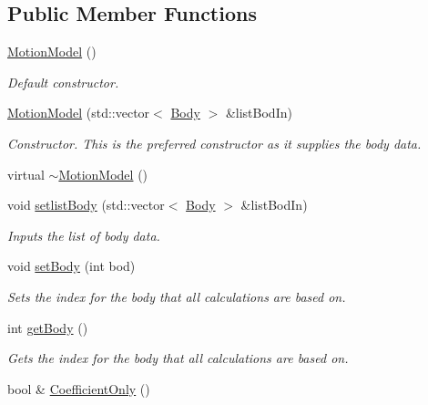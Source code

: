 \subsection*{Public Member Functions}
\begin{DoxyCompactItemize}
\item 
\hyperlink{classosea_1_1ofreq_1_1_motion_model_a5a5e4bba0f6ca24e1fdd316458f4f824}{Motion\-Model} ()
\begin{DoxyCompactList}\small\item\em Default constructor. \end{DoxyCompactList}\item 
\hyperlink{classosea_1_1ofreq_1_1_motion_model_aace42c5711b5486181e986add9a72b8f}{Motion\-Model} (std\-::vector$<$ \hyperlink{classosea_1_1ofreq_1_1_body}{Body} $>$ \&list\-Bod\-In)
\begin{DoxyCompactList}\small\item\em Constructor. This is the preferred constructor as it supplies the body data. \end{DoxyCompactList}\item 
virtual \hyperlink{classosea_1_1ofreq_1_1_motion_model_ac48a359c77d9efe39d4ec8c9e862a1cd}{$\sim$\-Motion\-Model} ()
\item 
void \hyperlink{classosea_1_1ofreq_1_1_motion_model_a92f6b9639a82aef868dbaf8445276d3c}{setlist\-Body} (std\-::vector$<$ \hyperlink{classosea_1_1ofreq_1_1_body}{Body} $>$ \&list\-Bod\-In)
\begin{DoxyCompactList}\small\item\em Inputs the list of body data. \end{DoxyCompactList}\item 
void \hyperlink{classosea_1_1ofreq_1_1_motion_model_a713b903a3e78141fff2af9c045755ffb}{set\-Body} (int bod)
\begin{DoxyCompactList}\small\item\em Sets the index for the body that all calculations are based on. \end{DoxyCompactList}\item 
int \hyperlink{classosea_1_1ofreq_1_1_motion_model_a72ee8cafa92a2dee644124d051856207}{get\-Body} ()
\begin{DoxyCompactList}\small\item\em Gets the index for the body that all calculations are based on. \end{DoxyCompactList}\item 
bool \& \hyperlink{classosea_1_1ofreq_1_1_motion_model_af4d34bfa133e77f1527cee1aa36b02f4}{Coefficient\-Only} ()

\end{DoxyCompactItemize}
